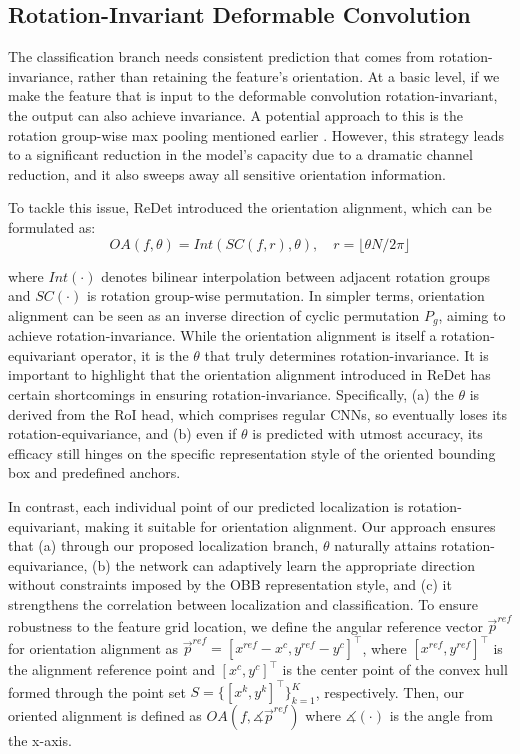 \documentclass[letterpaper]{article} %
\begin{document}
\subsection{Rotation-Invariant Deformable Convolution}
The classification branch needs consistent prediction that comes from rotation-invariance, rather than retaining the feature's orientation. At a basic level, if we make the feature that is input to the deformable convolution rotation-invariant, the output can also achieve invariance. A potential approach to this is the rotation group-wise max pooling mentioned earlier \citep{cohen2016group}. However, this strategy leads to a significant reduction in the model's capacity due to a dramatic channel reduction, and it also sweeps away all sensitive orientation information.

To tackle this issue, ReDet \citep{han2021ReDet} introduced the orientation alignment, which can be formulated as:
\begin{equation}
    OA(f, \theta) = \textit{Int}\left(SC(f, r), \theta\right), \quad r=\lfloor \theta N/2\pi \rfloor
\end{equation}

where $\textit{Int}(\cdot)$ denotes bilinear interpolation between adjacent rotation groups and \(SC(\cdot)\) is rotation group-wise permutation. In simpler terms, orientation alignment can be seen as an inverse direction of cyclic permutation \(P_g\), aiming to achieve rotation-invariance. While the orientation alignment is itself a rotation-equivariant operator, it is the \(\theta\) that truly determines rotation-invariance.  It is important to highlight that the orientation alignment introduced in ReDet has certain shortcomings in ensuring rotation-invariance. Specifically, (a) the \(\theta\) is derived from the RoI head, which comprises regular CNNs, so eventually loses its rotation-equivariance, and (b) even if
\(\theta\) is predicted with utmost accuracy, its efficacy still hinges on the specific representation style of the oriented bounding box and predefined anchors.


In contrast, each individual point of our predicted localization is rotation-equivariant, making it suitable for orientation alignment. Our approach ensures that (a) through our proposed localization branch, \(\theta\) naturally attains rotation-equivariance, (b) the network can adaptively learn the appropriate direction without constraints imposed by the OBB representation style, and (c) it strengthens the correlation between localization and classification. To ensure robustness to the feature grid location, we define the angular reference vector \(\vec{p}^{ref}\) for orientation alignment as \(\vec{p}^{ref}=[x^{ref}-x^c,y^{ref}-y^c]^\top\), where  \([x^{ref}, y^{ref}]^\top\) is the alignment reference point and \([x^c, y^c]^\top\) is the center point of the convex hull formed through the point set \( S = \{[x^k, y^k]^\top\}_{k=1}^K \), respectively. Then, our oriented alignment is defined as
$OA(f, \measuredangle \vec{p}^{ref} )$ where $\measuredangle(\cdot)$ is the angle from the x-axis.
\end{document}
